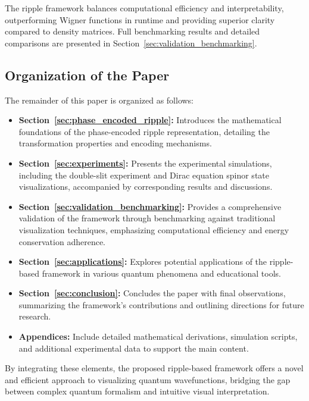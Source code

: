 \documentclass[12pt]{article}
\begin{document}
The ripple framework balances computational efficiency and interpretability, outperforming Wigner functions in runtime and providing superior clarity compared to density matrices. Full benchmarking results and detailed comparisons are presented in Section~\ref{sec:validation_benchmarking}.

\subsection{Organization of the Paper}

The remainder of this paper is organized as follows:
\begin{itemize}
    \item \textbf{Section~\ref{sec:phase_encoded_ripple}:} Introduces the mathematical foundations of the phase-encoded ripple representation, detailing the transformation properties and encoding mechanisms.
    \item \textbf{Section~\ref{sec:experiments}:} Presents the experimental simulations, including the double-slit experiment and Dirac equation spinor state visualizations, accompanied by corresponding results and discussions.
    \item \textbf{Section~\ref{sec:validation_benchmarking}:} Provides a comprehensive validation of the framework through benchmarking against traditional visualization techniques, emphasizing computational efficiency and energy conservation adherence.
    \item \textbf{Section~\ref{sec:applications}:} Explores potential applications of the ripple-based framework in various quantum phenomena and educational tools.
    \item \textbf{Section~\ref{sec:conclusion}:} Concludes the paper with final observations, summarizing the framework's contributions and outlining directions for future research.
    \item \textbf{Appendices:} Include detailed mathematical derivations, simulation scripts, and additional experimental data to support the main content.
\end{itemize}

By integrating these elements, the proposed ripple-based framework offers a novel and efficient approach to visualizing quantum wavefunctions, bridging the gap between complex quantum formalism and intuitive visual interpretation.
\end{document}
